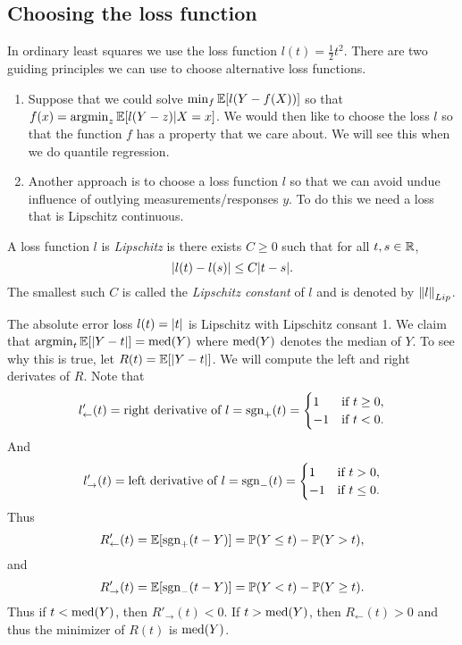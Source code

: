 \subsection{Choosing the loss function}
In ordinary least squares we use the loss function $l(t) = \frac{1}{2}t^2$. There are two guiding principles we can use to choose alternative loss functions.
\begin{enumerate}
    \item Suppose that we could solve $\min_f {\mathbb{E}}[l(Y-f(X))]$ so that $f(x) = \operatorname*{argmin}_z {\mathbb{E}}[l(Y-z)|X=x]$. We would then like to choose the loss $l$ so that the function $f$ has a property that we care about. We will see this when we do quantile regression.
    \item Another approach is to choose a loss function $l$ so that we can avoid undue influence of outlying measurements/responses $y$. To do this we need a loss that is Lipschitz continuous. 
\end{enumerate}
\begin{defn}
    A loss function $l$ is \emph{Lipschitz} is there exists $C \ge 0$ such that for all $t,s\in {\mathbb R}$,
    \[{\left\lvert l(t)-l(s)\right\rvert} \le C{\left\lvert t-s\right\rvert}. \]
    The smallest such $C$ is called the \emph{Lipschitz constant} of $l$ and is denoted by $\left\|l\right\|_{Lip}$.
\end{defn}
\begin{ex}
    The absolute error loss $l(t)={\left\lvert t\right\rvert}$ is Lipschitz with Lipschitz consant 1. We claim that $\operatorname*{argmin}_t {\mathbb{E}}[{\left\lvert Y-t\right\rvert}]=\operatorname{med}(Y)$ where $\operatorname{med}(Y)$ denotes the median of $Y$. To see why this is true, let $R(t)={\mathbb{E}}[{\left\lvert Y-t\right\rvert}]$. We will compute the left and right derivates of $R$. Note that
    \[l'_{\leftarrow}(t)=\text{right derivative of $l$}=\operatorname{sgn}_+(t)=\begin{cases}
        1 &\text{if } t \ge 0,\\
        -1 &\text{if } t< 0.
    \end{cases}\]
    And
    \[l'_{\rightarrow}(t)=\text{left derivative of $l$}=\operatorname{sgn}_-(t)=\begin{cases}
        1 &\text{if } t > 0,\\
        -1 &\text{if } t\le 0.
    \end{cases}\]
    Thus
    \[R'_{\leftarrow}(t)={\mathbb{E}}[\operatorname{sgn}_+(t-Y)]={\mathbb{P}}(Y \le t)-{\mathbb{P}}(Y>t),\]
    and
    \[R'_{\rightarrow}(t)={\mathbb{E}}[\operatorname{sgn}_-(t-Y)]={\mathbb{P}}(Y <t)-{\mathbb{P}}(Y \ge t). \]
    Thus if $t < \operatorname{med}(Y)$, then $R'_{\to}(t) < 0$. If $t > \operatorname{med}(Y)$, then $R_{\leftarrow}(t) > 0$ and thus the minimizer of $R(t)$ is $\operatorname{med}(Y)$.
\end{ex}
